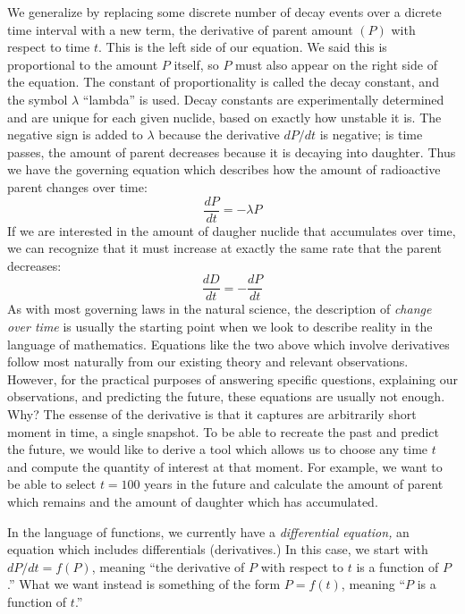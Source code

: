 \documentclass[addpoints, 12pt]{exam}
\begin{document}
We generalize by replacing some discrete number of decay events over a dicrete time interval with a new term, the derivative of parent amount $(P)$ with respect to time $t$. This is the left side of our equation. We said this is proportional to the amount $P$ itself, so $P$ must also appear on the right side of the equation. The constant of proportionality is called the decay constant, and the symbol $\lambda$ ``lambda'' is used. Decay constants are experimentally determined and are unique for each given nuclide, based on exactly how unstable it is. The negative sign is added to $\lambda$ because the derivative $dP/dt$ is negative; is time passes, the amount of parent decreases because it is decaying into daughter. Thus we have the governing equation which describes how the amount of radioactive parent changes over time:
\begin{equation}
	\boxed{\frac{dP}{dt}=-\lambda P}\label{decay}
\end{equation}
If we are interested in the amount of daugher nuclide that accumulates over time, we can recognize that it must increase at exactly the same rate that the parent decreases:
\begin{equation}
	\boxed{\frac{dD}{dt}=-\frac{dP}{dt}}\label{parent-daughter}
\end{equation}
As with most governing laws in the natural science, the description of \emph{change over time} is usually the starting point when we look to describe reality in the language of mathematics. Equations like the two above which involve derivatives follow most naturally from our existing theory and relevant observations. However, for the practical purposes of answering specific questions, explaining our observations, and predicting the future, these equations are usually not enough. Why? The essense of the derivative is that it captures are arbitrarily short moment in time, a single snapshot. To be able to recreate the past and predict the future, we would like to derive a tool which allows us to choose any time $t$ and compute the quantity of interest at that moment. For example, we want to be able to select $t=100$ years in the future and calculate the amount of parent which remains and the amount of daughter which has accumulated. 

In the language of functions, we currently have a \emph{differential equation,} an equation which includes differentials (derivatives.) In this case, we start with $dP/dt=f(P)$, meaning ``the derivative of $P$ with respect to $t$ is a function of $P$.'' What we want instead is something of the form $P=f(t)$, meaning ``$P$ is a function of $t$.'' 
\end{document}
